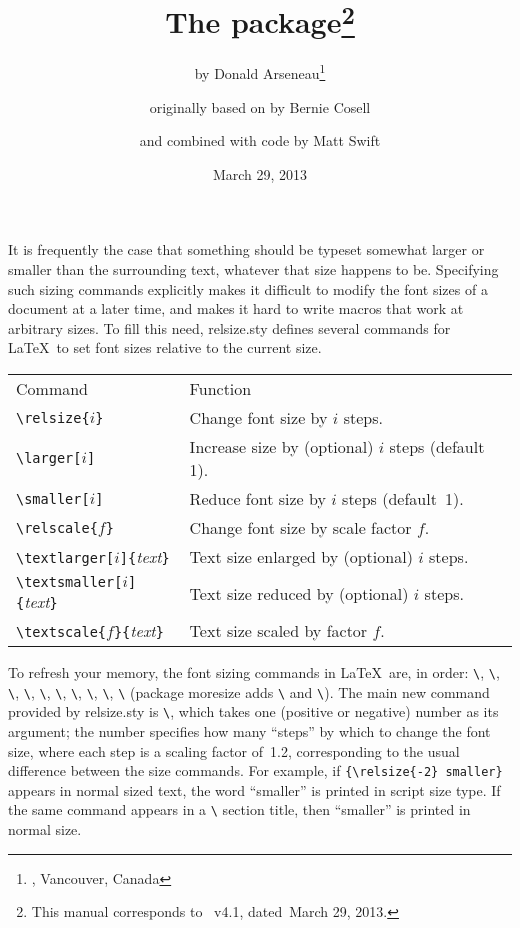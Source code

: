 \documentclass[12pt,pagesize=auto]{scrartcl}
\title{The \pkg{relsize} package\thanks
  {This manual corresponds to \pkg{relsize.sty}~v4.1, dated~March 29, 2013.}}
\author{%
  by Donald Arseneau\thanks{\mail{asnd@triumf.ca},  Vancouver, Canada}%
  \and originally based on \pkg{smaller.sty} by Bernie Cosell
  \and and combined with code by Matt Swift
}
\date{March 29, 2013}
\makeatletter
\newcommand*{\pkg}[1]{\textsf{#1}}
\newcommand*{\cs}[1]{\texttt{\textbackslash#1}}
\newcommand*{\cmd}[1]{\cs{\expandafter\@gobble\string#1}}
\newcommand*{\meta}[1]{\textlangle\textsl{#1}\textrangle}
\newcommand*{\marg}[1]{\texttt{\{}\meta{#1}\texttt{\}}}
\makeatother
\begin{document}
\maketitle

\sloppy
\linespread{1.05}\selectfont

\noindent
It is frequently the case that something should be typeset somewhat larger
or smaller than the surrounding text, whatever that size happens to be.
Specifying such sizing commands explicitly makes it difficult to modify the
font sizes of a document at a later time, and makes it hard to write macros
that work at arbitrary sizes.  To fill this need, \pkg{relsize.sty} defines 
several commands for \LaTeX\ to set font sizes relative to the current size.

\begin{center}
  \begin{tabular*}{\textwidth}{@{\extracolsep{\fill}}lll@{}}
    \toprule
    Command           & Function \\
    \cmidrule(r){1-1}         \cmidrule(lr){2-2} 
    \verb|\relsize{|$i$\verb|}|   & Change font size by $i$ steps.\\
    \verb|\larger[|$i$\verb|]|    & Increase size by (optional) $i$ steps (default 1).\\
    \verb|\smaller[|$i$\verb|]|   & Reduce font size by $i$ steps (default~1).\\
    \verb|\relscale{|$f$\verb|}|  & Change font size by scale factor $f$.\\
    \verb|\textlarger[|$i$\verb|]|\marg{text}  & Text size enlarged by (optional) $i$ steps.\\
    \verb|\textsmaller[|$i$\verb|]|\marg{text} & Text size reduced by (optional) $i$ steps.\\
    \verb|\textscale{|$f$\verb|}|\marg{text}   & Text size scaled by factor $f$.\\
    \bottomrule
  \end{tabular*}
\end{center}

To refresh your memory, the font sizing commands in \LaTeX\ are, in order:
\cmd{\tiny}, \cmd{\scriptsize}, \cmd{\footnotesize}, \cmd{\small}, 
\cmd{\normalsize}, \cmd{\large}, \cmd{\Large}, \cmd{\LARGE}, \cmd{\huge}, 
\cmd{\Huge} (package \pkg{moresize} adds \cmd{\ssmall} and \cmd{\HUGE}).  
The main new command provided by \pkg{relsize.sty} is \cmd{\relsize}, 
which takes one (positive or negative) number as its argument; the number 
specifies how many ``steps'' by which to change the font size, where each 
step is a scaling factor of~1.2, corresponding to the usual difference 
between the size commands.  For example, if \verb|{\relsize{-2} smaller}| 
appears in normal sized text, the word ``smaller'' is printed in script 
size type.  If the same command appears in a \cmd{\Large} section title, 
then ``smaller'' is printed in normal size. 
\end{document}
